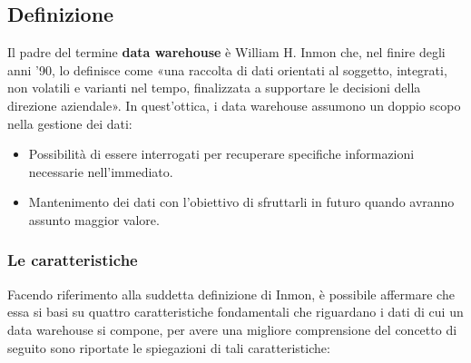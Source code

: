\subsection{Definizione}

Il padre del termine \textbf{data warehouse} è William H. Inmon che, nel finire degli anni ’90, lo definisce come «una raccolta di dati orientati al soggetto, integrati, non volatili e varianti nel tempo, finalizzata a supportare le decisioni della direzione aziendale». In quest’ottica, i data warehouse assumono un doppio scopo nella gestione dei dati:\cite{inmon_building_the_data_warehouse}

\begin{itemize}
    \item Possibilità di essere interrogati per recuperare specifiche informazioni necessarie nell’immediato.
    \item Mantenimento dei dati con l’obiettivo di sfruttarli in futuro quando avranno assunto maggior valore.
\end{itemize}

\subsubsection{Le caratteristiche}

Facendo riferimento alla suddetta definizione di Inmon, è possibile affermare che essa si basi su quattro caratteristiche fondamentali che riguardano i dati di cui un data warehouse si compone, per avere una migliore comprensione del concetto di seguito sono riportate le spiegazioni di tali caratteristiche:\cite{researchgate_data_warehouse_architecture}

